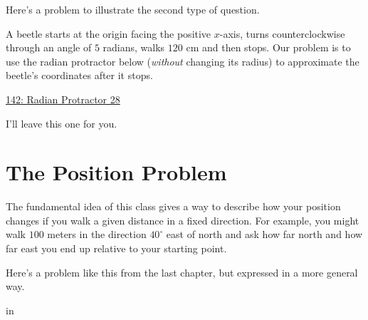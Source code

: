 \documentclass{ximera}
\newcommand{\pskip}{\vskip 0.1 in}
\begin{document}
Here's a problem to illustrate the second type of question.

\begin{question} \label{QBeerteee}
A beetle starts at the origin facing the positive $x$-axis, turns counterclockwise through an angle of $5$ radians, walks $120$ cm and then stops. Our problem is to use the radian protractor below (\emph{without} changing its radius) to approximate the beetle's coordinates after it stops.

\begin{onlineOnly}
    \begin{center}
\end{center}

\href{https://www.desmos.com/calculator/jqc8dd0iws}{142: Radian Protractor 28}

\end{onlineOnly}

I'll leave this one for you.

\end{question}



\section{The Position Problem}

The fundamental idea of this class gives a way to describe how your position changes if you walk a given distance in a fixed direction. For example, you might walk $100$ meters in the direction $40^\circ$ east of north and ask how far north and how far east you end up relative to your starting point.

Here's a problem like this from the last chapter, but expressed in a more general way.

\pskip
\end{document}
